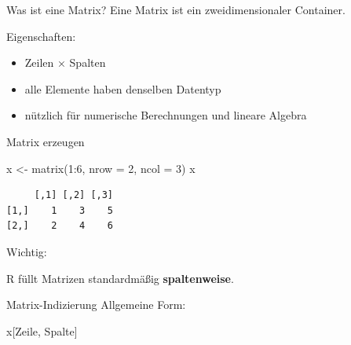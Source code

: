 \documentclass[
  10pt,
  ignorenonframetext,
  aspectratio=169,
]{beamer}
\newenvironment{Shaded}{}{}
\newcommand{\AttributeTok}[1]{\textcolor[rgb]{0.49,0.56,0.16}{#1}}
\newcommand{\DecValTok}[1]{\textcolor[rgb]{0.25,0.63,0.44}{#1}}
\newcommand{\FunctionTok}[1]{\textcolor[rgb]{0.02,0.16,0.49}{#1}}
\newcommand{\NormalTok}[1]{#1}
\newcommand{\OtherTok}[1]{\textcolor[rgb]{0.00,0.44,0.13}{#1}}
\newcommand{\SpecialCharTok}[1]{\textcolor[rgb]{0.25,0.44,0.63}{#1}}
\providecommand{\tightlist}{%
  \setlength{\itemsep}{0pt}\setlength{\parskip}{0pt}}
\begin{document}
\begin{frame}{Was ist eine Matrix?}
\label{was-ist-eine-matrix}
Eine Matrix ist ein zweidimensionaler Container.

Eigenschaften:

\begin{itemize}
\tightlist
\item
  Zeilen × Spalten
\item
  alle Elemente haben denselben Datentyp
\item
  nützlich für numerische Berechnungen und lineare Algebra
\end{itemize}
\end{frame}

\begin{frame}[fragile]{Matrix erzeugen}
\label{matrix-erzeugen}
\begin{Shaded}
\begin{Highlighting}[]
\NormalTok{x }\OtherTok{\textless{}{-}} \FunctionTok{matrix}\NormalTok{(}\DecValTok{1}\SpecialCharTok{:}\DecValTok{6}\NormalTok{, }\AttributeTok{nrow =} \DecValTok{2}\NormalTok{, }\AttributeTok{ncol =} \DecValTok{3}\NormalTok{)}
\NormalTok{x}
\end{Highlighting}
\end{Shaded}

\begin{verbatim}
     [,1] [,2] [,3]
[1,]    1    3    5
[2,]    2    4    6
\end{verbatim}

Wichtig:

R füllt Matrizen standardmäßig \textbf{spaltenweise}.
\end{frame}

\begin{frame}[fragile]{Matrix-Indizierung}
\label{matrix-indizierung}
Allgemeine Form:

\begin{Shaded}
\begin{Highlighting}[]
\NormalTok{x[Zeile, Spalte]}
\end{Highlighting}
\end{Shaded}
\end{frame}
\end{document}
